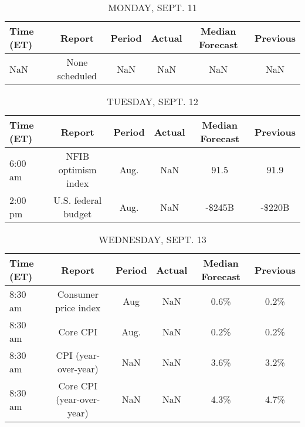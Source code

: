 \documentclass{article}%
\begin{document}
%
\normalsize%


\begin{table}[htbp]%
\caption{MONDAY, SEPT. 11}%
\centering%
\begin{adjustbox}{width=1\textwidth}%
\begin{tabular}{lccccc}
\toprule
Time (ET) &         Report & Period & Actual & Median Forecast & Previous \\
\midrule
      NaN & None scheduled &    NaN &    NaN &             NaN &      NaN \\
\bottomrule
\end{tabular}
%
\end{adjustbox}%
\end{table}

%


\begin{table}[htbp]%
\caption{TUESDAY, SEPT. 12}%
\centering%
\begin{adjustbox}{width=1\textwidth}%
\begin{tabular}{lccccc}
\toprule
Time (ET) &              Report & Period & Actual & Median Forecast & Previous \\
\midrule
  6:00 am & NFIB optimism index &   Aug. &    NaN &            91.5 &     91.9 \\
  2:00 pm & U.S. federal budget &   Aug. &    NaN &          -\$245B &   -\$220B \\
\bottomrule
\end{tabular}
%
\end{adjustbox}%
\end{table}

%


\begin{table}[htbp]%
\caption{WEDNESDAY, SEPT. 13}%
\centering%
\begin{adjustbox}{width=1\textwidth}%
\begin{tabular}{lccccc}
\toprule
Time (ET) &                    Report & Period & Actual & Median Forecast & Previous \\
\midrule
  8:30 am &      Consumer price index &    Aug &    NaN &            0.6\% &     0.2\% \\
  8:30 am &                  Core CPI &   Aug. &    NaN &            0.2\% &     0.2\% \\
  8:30 am &      CPI (year-over-year) &    NaN &    NaN &            3.6\% &     3.2\% \\
  8:30 am & Core CPI (year-over-year) &    NaN &    NaN &            4.3\% &     4.7\% \\
\bottomrule
\end{tabular}
%
\end{adjustbox}%
\end{table}
\end{document}
